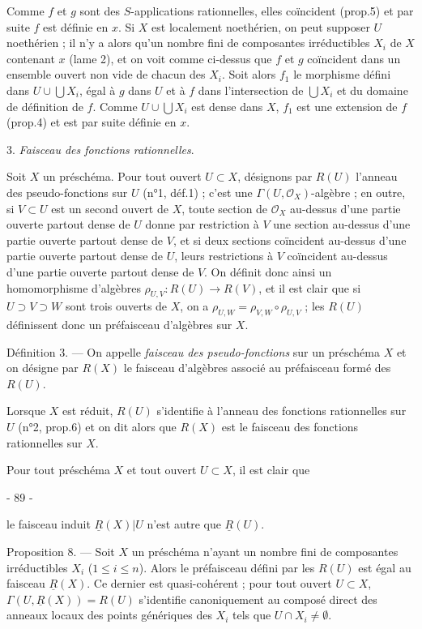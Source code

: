Comme $f$ et $g$ sont des $S$-applications rationnelles, elles coïncident (prop.5) et par suite $f$ est définie en $x$. Si $X$ est localement noethérien, on peut supposer $U$ noethérien ; il n'y a alors qu'un nombre fini de composantes irréductibles $X_i$ de $X$ contenant $x$ (lame 2), et on voit comme ci-dessus que $f$ et $g$ coïncident dans un ensemble ouvert non vide de chacun des $X_i$. Soit alors $f_1$ le morphisme défini dans $U \cup \bigcup X_i$, égal à $g$ dans $U$ et à $f$ dans l'intersection de $\bigcup X_i$ et du domaine de définition de $f$. Comme $U \cup \bigcup X_i$ est dense dans $X$, $f_1$ est une extension de $f$ (prop.4) et est par suite définie en $x$.

3. \emph{Faisceau des fonctions rationnelles}.

Soit $X$ un préschéma. Pour tout ouvert $U \subset X$, désignons par $R(U)$ l'anneau des pseudo-fonctions sur $U$ (n°1, déf.1) ; c'est une $\Gamma(U, \mathcal{O}_X)$-algèbre ; en outre, si $V \subset U$ est un second ouvert de $X$, toute section de $\mathcal{O}_X$ au-dessus d'une partie ouverte partout dense de $U$ donne par restriction à $V$ une section au-dessus d'une partie ouverte partout dense de $V$, et si deux sections coïncident au-dessus d'une partie ouverte partout dense de $U$, leurs restrictions à $V$ coïncident au-dessus d'une partie ouverte partout dense de $V$. On définit donc ainsi un homomorphisme d'algèbres $\rho_{U,V} : R(U) \to R(V)$, et il est clair que si $U \supset V \supset W$ sont trois ouverts de $X$, on a $\rho_{U,W} = \rho_{V,W} \circ \rho_{U,V}$ ; les $R(U)$ définissent donc un préfaisceau d'algèbres sur $X$.

Définition 3. --- On appelle \emph{faisceau des pseudo-fonctions} sur un préschéma $X$ et on désigne par $R(X)$ le faisceau d'algèbres associé au préfaisceau formé des $R(U)$.

Lorsque $X$ est réduit, $R(U)$ s'identifie à l'anneau des fonctions rationnelles sur $U$ (n°2, prop.6) et on dit alors que $R(X)$ est le faisceau des fonctions rationnelles sur $X$.

Pour tout préschéma $X$ et tout ouvert $U \subset X$, il est clair que

\newpage


- 89 -

le faisceau induit $\underline{R}(X)|U$ n'est autre que $\underline{R}(U)$.

Proposition 8. — Soit $X$ un préschéma n'ayant un nombre fini de composantes irréductibles $X_i$ ($1 \le i \le n$). Alors le préfaisceau défini par les $R(U)$ est égal au faisceau $\underline{R}(X)$. Ce dernier est quasi-cohérent ; pour tout ouvert $U \subset X$, $\Gamma(U, \underline{R}(X)) = R(U)$ s'identifie canoniquement au composé direct des anneaux locaux des points génériques des $X_i$ tels que $U \cap X_i \neq \emptyset$.

